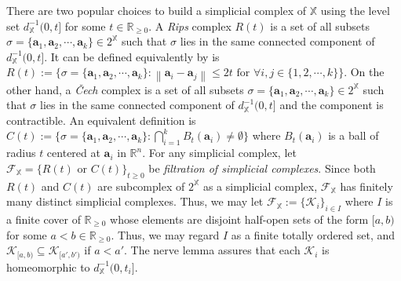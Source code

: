 \documentclass[11pt]{article}
\newcommand{\bbR}{\mathbb{R}}
\newcommand{\norm}[1]{\left\lVert#1\right\rVert}
\newcommand{\R}{\mathbb{R}} %
\newcommand{\ptcloudx}{\mathbb{X}} %
\newcommand{\veca}{\mathbf{a}} %
\begin{document}
There are two popular choices to build a simplicial complex of $\ptcloudx$ using the level set $d_{\ptcloudx}^{-1}(0,t]$ for some $t \in \bbR_{\geq0}$. A \emph{Rips} complex $R(t)$ is a set of all subsets $\sigma =\{ \veca_{1}, \veca_{2}, \cdots, \veca_{k} \} \in 2^{\ptcloudx}$ such that $\sigma$ lies in the same connected component of $d_{\ptcloudx}^{-1}(0,t]$. It can be defined equivalently by is $R(t):= \{ \sigma = \{ \veca_{1}, \veca_{2}, \cdots, \veca_{k}\} : \norm{\veca_{i}-\veca_{j}} \leq 2t \text{ for } \forall  i,j \in \{ 1,2, \cdots, k\} \}.$ On the other hand, a \emph{\v{C}ech} complex is a set of all subsets $\sigma =\{ \veca_{1}, \veca_{2}, \cdots, \veca_{k} \} \in 2^{\ptcloudx}$ such that $\sigma$ lies in the same connected component of $d_{\ptcloudx}^{-1}(0,t]$ and the component is contractible. An equivalent definition is $C(t):=\{ \sigma = \{ \veca_{1}, \veca_{2}, \cdots, \veca_{k}\} : \bigcap_{i=1}^{k}B_{t}(\veca_{i}) \neq\emptyset\}$ where $B_{t}(\veca_{i})$ is a ball of radius $t$ centered at $\veca_{i}$ in $\R^{n}$. For any simplicial complex, let $\mathcal{F}_{\ptcloudx}= \{ R(t) \text{ or }C(t) \}_{t \geq 0}$ be \emph{filtration of simplicial complexes}. Since both $R(t)$ and $C(t)$ are subcomplex of $2^{\ptcloudx}$ as a simplicial complex, $\mathcal{F}_{\ptcloudx}$ has finitely many distinct simplicial complexes. Thus, we may let $\mathcal{F}_{\ptcloudx}:= \{ \mathcal{K}_{i} \}_{i \in I}$ where $I$ is a finite cover of $\R_{\geq0}$ whose elements are disjoint half-open sets of the form $[a,b)$ for some $a<b \in \R_{\geq0}$. Thus, we may regard $I$ as a finite totally ordered set, and $\mathcal{K}_{[a,b)} \subseteq \mathcal{K}_{[a',b')}$ if $a<a'$. The nerve lemma \citep{munch} assures that each $\mathcal{K}_{i}$ is homeomorphic to $d_{\ptcloudx}^{-1}(0,t_{i}]$. 
\end{document}
